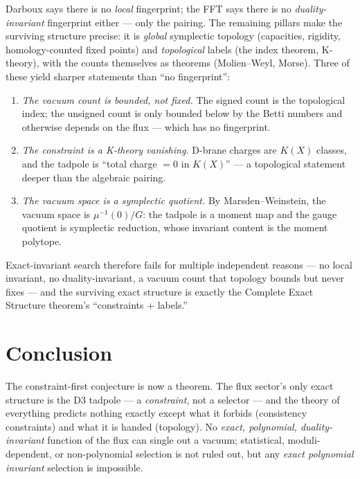 \documentclass[11pt]{article}
\begin{document}
Darboux says there is no \emph{local} fingerprint; the FFT says there is no
\emph{duality-invariant} fingerprint either --- only the pairing. The remaining pillars
make the surviving structure precise: it is \emph{global} symplectic topology (capacities,
rigidity, homology-counted fixed points) and \emph{topological} labels (the index theorem,
K-theory), with the counts themselves as theorems (Molien--Weyl, Morse). Three of these
yield sharper statements than ``no fingerprint'':

\begin{enumerate}
\item \emph{The vacuum count is bounded, not fixed.} The signed count is the topological
index; the unsigned count is only bounded below by the Betti numbers and otherwise depends
on the flux --- which has no fingerprint.
\item \emph{The constraint is a K-theory vanishing.} D-brane charges are $K(X)$ classes, and
the tadpole is ``total charge $=0$ in $K(X)$'' --- a topological statement deeper than the
algebraic pairing.
\item \emph{The vacuum space is a symplectic quotient.} By Marsden--Weinstein, the vacuum
space is $\mu^{-1}(0)/G$: the tadpole is a moment map and the gauge quotient is symplectic
reduction, whose invariant content is the moment polytope.
\end{enumerate}

Exact-invariant search therefore fails for multiple independent reasons --- no local invariant,
no duality-invariant, a vacuum count that topology bounds but never fixes --- and the
surviving exact structure is exactly the Complete Exact Structure theorem's ``constraints +
labels.''

\section{Conclusion}

The constraint-first conjecture is now a theorem. The flux sector's only exact
structure is the D3 tadpole --- a \emph{constraint}, not a selector --- and the
theory of everything predicts nothing exactly except what it forbids (consistency
constraints) and what it is handed (topology). No \emph{exact, polynomial,
duality-invariant} function of the flux can single out a vacuum; statistical,
moduli-dependent, or non-polynomial selection is not ruled out, but any \emph{exact polynomial
invariant} selection is impossible.
\end{document}

